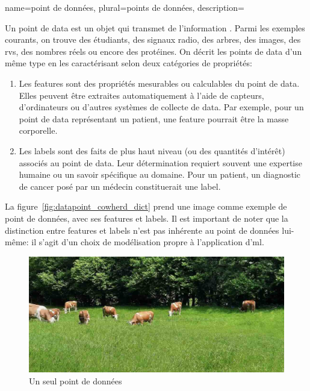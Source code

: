 {name={point de données}, 
	plural={points de données},
	description={Un point de \gls{data} est un objet qui transmet de l'information \cite{coverthomas}. 
		Parmi les exemples courants, on trouve des étudiants, des signaux radio, des arbres, des images, 
		des \glspl{rv}, des nombres réels ou encore des protéines. On décrit les points de \gls{data} d’un même type en les caractérisant selon deux catégories de propriétés:
		\begin{enumerate}
			\item Les \glspl{feature} sont des propriétés mesurables ou calculables du point de \gls{data}. 
			Elles peuvent être extraites automatiquement à l’aide de capteurs, d’ordinateurs ou d’autres 
			systèmes de collecte de \gls{data}. Par exemple, pour un point de \gls{data} représentant un patient, 
			une \gls{feature} pourrait être la masse corporelle.
			\item Les \glspl{label} sont des faits de plus haut niveau (ou des quantités d’intérêt) 
			associés au point de \gls{data}. Leur détermination requiert souvent une expertise humaine ou 
			un savoir spécifique au domaine. Pour un patient, un diagnostic de cancer posé par un médecin 
			constituerait une \gls{label}.
		\end{enumerate}
		La figure~\ref{fig:datapoint_cowherd_dict} prend une image comme exemple de point de données, 
		avec ses \glspl{feature} et \glspl{label}. Il est important de noter que la distinction entre 
		\glspl{feature} et \glspl{label} n’est pas inhérente au point de données lui-même: 
		il s’agit d’un choix de modélisation propre à l’application d'\gls{ml}.
		\begin{figure}[htbp]
			\centering
			\begin{minipage}[t]{0.95\textwidth}
				\centering
				\includegraphics[width=\textwidth]{../../assets/CowsAustria.jpg}
				\caption*{Un seul point de données}
				\vspace{5mm}

\end{minipage}
\end{figure}}}
